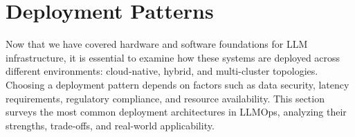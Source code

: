 \section{Deployment Patterns}
\label{sec:deploy}

Now that we have covered hardware and software foundations for LLM infrastructure, it is essential to examine how these systems are deployed across different environments: cloud-native, hybrid, and multi-cluster topologies. 
Choosing a deployment pattern depends on factors such as data security, latency requirements, regulatory compliance, and resource availability. 
This section surveys the most common deployment architectures in LLMOps, analyzing their strengths, trade-offs, and real-world applicability.

